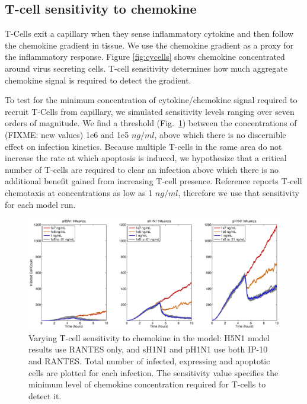 \documentclass[10pt]{article}
\begin{document}
\subsection*{T-cell sensitivity to chemokine}

T-Cells exit a capillary when they sense inflammatory cytokine and then follow the chemokine gradient in tissue.  We use the chemokine gradient as a proxy for the inflammatory response.  Figure \ref{fig:cycells} shows chemokine concentrated around virus secreting cells.  T-cell sensitivity determines how much aggregate chemokine signal is required to detect the gradient.

To test for the minimum concentration of cytokine/chemokine signal required to recruit T-Cells from capillary, we simulated sensitivity levels ranging over seven orders of magnitude. We find a threshold (Fig.~\ref{fig:sensitivity}) between the concentrations of (FIXME: new values) 1e6 and 1e5 $ng/ml$, above which there is no discernible effect on infection kinetics.  Because multiple T-cells in the same area do not increase the rate at which apoptosis is induced, we hypothesize that a critical number of T-cells are required to clear an infection above which there is no additional benefit gained from increasing T-cell presence.  Reference \cite{Gao2003} reports T-cell chemotaxis at concentrations as low as 1 $ng/ml$, therefore we use that sensitivity for each model run.

\begin{figure}[ht!]
\begin{center}
 \includegraphics[width=\textwidth]{sensitivity}
 \end{center}
\caption{Varying T-cell sensitivity to chemokine in the model: H5N1 model results use RANTES  only, and sH1N1 and pH1N1 use both IP-10 and RANTES. Total number of infected, expressing and apoptotic cells are plotted for each infection.  The sensitivity value specifies the minimum level of chemokine concentration required for T-cells to detect it. } 
 \label{fig:sensitivity}
\end{figure}
\end{document}
